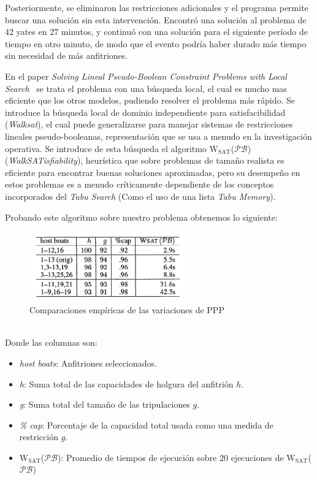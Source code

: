 \documentclass[letter, 10pt]{article}
\begin{document}
\begin{itemize}
\begin{itemize}
Posteriormente, se eliminaron las restricciones adicionales y el programa permite buscar una solución sin esta intervención. Encontró una solución al problema de 42 yates en 27 minutos, y continuó con una solución para el siguiente período de tiempo en otro minuto, de modo que el evento podría haber durado más tiempo sin necesidad de más anfitriones.
\end{itemize}
\end{itemize}

En el paper \textit{Solving Lineal Pseudo-Boolean Constraint Problems with Local Search}~\cite{Walser:1997:SLP:1867406.1867448} se trata el problema con una búsqueda local, el cual es mucho mas eficiente que los otros modelos, pudiendo resolver el problema más rápido. Se introduce la búsqueda local de dominio independiente para satisfacibilidad (\textit{Walksat}), el cual puede generalizarse para manejar sistemas de restricciones lineales pseudo-booleanas, representación que se usa a menudo en la investigación operativa. Se introduce de esta búsqueda el algoritmo $\text{W}_{\text{SAT}}$($\mathcal{PB}$) (\textit{WalkSATisfiability}), heurística que sobre problemas de tamaño realista es eficiente para encontrar buenas soluciones aproximadas, pero su desempeño en estos problemas es a menudo críticamente dependiente de los conceptos incorporados del \textit{Tabu Search} (Como el uso de una lista \textit{Tabu Memory}).

Probando este algoritmo sobre nuestro problema obtenemos lo siguiente:
\begin{figure}[ht]
\centering
 \includegraphics[width=0.6\textwidth]{party4.png}
 \caption{Comparaciones empíricas de las variaciones de PPP}
\end{figure}
\\
Donde las columnas son:

\begin{itemize}
\item \textit{host boats}: Anfitriones seleccionados.
\item \textit{h}: Suma total de las capacidades de holgura del anfitrión $h$.
\item \textit{g}: Suma total del tamaño de las tripulaciones $g$.
\item \textit{\% cap}: Porcentaje de la capacidad total usada como una medida de restricción $g$.
\item $\text{W}_{\text{SAT}}$($\mathcal{PB}$): Promedio de tiempos de ejecución sobre 20 ejecuciones de $\text{W}_{\text{SAT}}$($\mathcal{PB}$)
\end{itemize}
\end{document}
